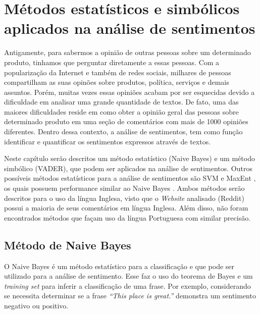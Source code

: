 \chapter{Métodos estatísticos e simbólicos aplicados na análise de sentimentos}
\label{cap:Classificadores}

Antigamente, para sabermos a opinião de outras pessoas sobre um
determinado produto, tinhamos que perguntar diretamente a essas pessoas. Com a
popularização da Internet e também de redes sociais, milhares de pessoas
compartilham as suas opinões sobre produtos, política, serviços e
demais assuntos. Porém, muitas vezes essas opiniões acabam
por ser esquecidas devido a dificuldade em analisar uma grande quantidade de
textos. De fato, uma das maiores dificuldades reside em como obter a opinião
geral das pessoas sobre determinado produto em uma seção de comentários com mais
de 1000 opiniões diferentes. Dentro dessa contexto, a análise de sentimentos,
tem como função identificar e quantificar os sentimentos expressos através de
textos.

Neste capítulo serão descritos um método estatístico (Naive Bayes) e um método
simbólico (\ac{VADER}), que podem ser aplicados na análise de sentimentos.
Outros possíveis métodos estatísticos para a análise de sentimentos são \ac{SVM}
\cite{Hearst:1998:SVM:630302.630387} e \ac{MaxEnt}
\cite{Berger:1996:MEA:234285.234289}, os quais possuem performance similar ao Naive Bayes \cite{Pang:2002:TUS:1118693.1118704}. Ambos métodos serão descritos para o uso da língua Inglesa, visto que o \textit{Website} analisado (Reddit) possui a maioria de seus
comentários em língua Inglesa. Além disso, não foram encontrados métodos que
façam uso da língua Portuguesa com similar precisão.





\section{Método de Naive Bayes}

O Naive Bayes é um método estatístico para a classificação e que pode ser
utilizado para a análise de sentimento. Esse faz o uso do teorema de Bayes e um
\textit{training set} para inferir a classificação de uma frase. Por exemplo,
considerando se necessita determinar se a frase \textit{``This place is
great.''} demonstra um sentimento negativo ou positivo.

